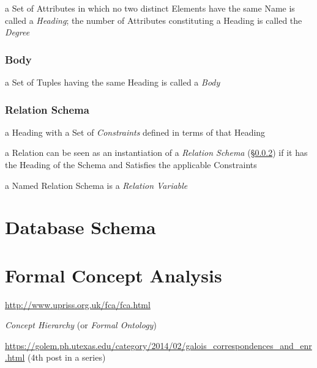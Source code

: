 a Set of Attributes in which no two distinct Elements have the same Name is
called a \emph{Heading}; the number of Attributes constituting a Heading is
called the \emph{Degree}



\subsubsection{Body}\label{sec:body}

a Set of Tuples having the same Heading is called a \emph{Body}



\subsubsection{Relation Schema}\label{sec:relation_schema}

a Heading with a Set of \emph{Constraints} defined in terms of that Heading

a Relation can be seen as an instantiation of a \emph{Relation Schema}
(\S\ref{sec:relation_schema}) if it has the Heading of the Schema and Satisfies
the applicable Constraints

a Named Relation Schema is a \emph{Relation Variable}



\section{Database Schema}\label{sec:database_schema}

\section{Formal Concept Analysis}\label{sec:fca}


\url{http://www.upriss.org.uk/fca/fca.html}

\emph{Concept Hierarchy} (or \emph{Formal Ontology})

\url{https://golem.ph.utexas.edu/category/2014/02/galois_correspondences_and_enr.html}
(4th post in a series)



